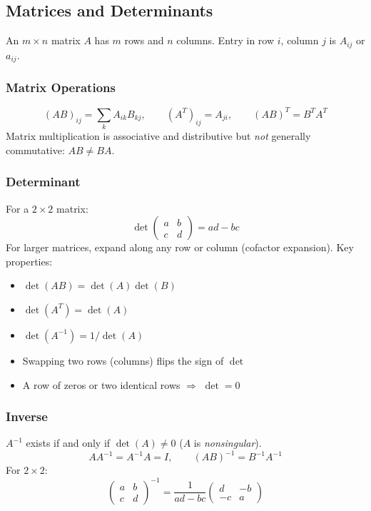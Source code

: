 \documentclass[11pt, letterpaper]{article}
\theoremstyle{plain}
\begin{document}
\subsection{Matrices and Determinants}

An $m\times n$ matrix $A$ has $m$ rows and $n$ columns. Entry in row $i$,
column $j$ is $A_{ij}$ or $a_{ij}$.

\subsubsection*{Matrix Operations}
\[
    (AB)_{ij} = \sum_k A_{ik}B_{kj}, \qquad
    (A^T)_{ij} = A_{ji}, \qquad
    (AB)^T = B^T A^T
\]
Matrix multiplication is associative and distributive but \emph{not}
generally commutative: $AB \neq BA$.

\subsubsection*{Determinant}
For a $2\times 2$ matrix:
\[
    \det\begin{pmatrix} a & b \\ c & d \end{pmatrix} = ad - bc
\]
For larger matrices, expand along any row or column (cofactor expansion).
Key properties:
\begin{itemize}
    \item $\det(AB) = \det(A)\det(B)$
    \item $\det(A^T) = \det(A)$
    \item $\det(A^{-1}) = 1/\det(A)$
    \item Swapping two rows (columns) flips the sign of $\det$
    \item A row of zeros or two identical rows $\Rightarrow$ $\det = 0$
\end{itemize}

\subsubsection*{Inverse}
$A^{-1}$ exists if and only if $\det(A) \neq 0$ ($A$ is \emph{nonsingular}).
\[
    AA^{-1} = A^{-1}A = I, \qquad
    (AB)^{-1} = B^{-1}A^{-1}
\]
For $2\times 2$:
\[
    \begin{pmatrix} a & b \\ c & d \end{pmatrix}^{-1}
    = \frac{1}{ad-bc}\begin{pmatrix} d & -b \\ -c & a \end{pmatrix}
\]
\end{document}
